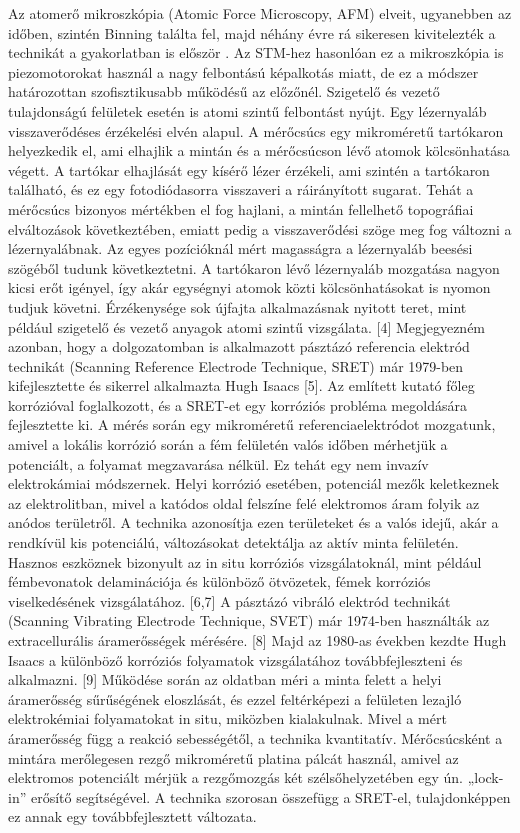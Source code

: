 Az atomerő mikroszkópia (Atomic Force Microscopy, AFM) elveit, ugyanebben az időben, szintén Binning találta fel, majd néhány évre rá sikeresen kivitelezték a technikát a gyakorlatban is először \cite{binnig1986atomic}. Az STM-hez hasonlóan ez a mikroszkópia is piezomotorokat használ a nagy felbontású képalkotás miatt, de ez a módszer határozottan szofisztikusabb működésű az előzőnél. Szigetelő és vezető tulajdonságú felületek esetén is atomi szintű felbontást nyújt. Egy lézernyaláb visszaverődéses érzékelési elvén alapul. A mérőcsúcs egy mikroméretű tartókaron helyezkedik el, ami elhajlik a mintán és a mérőcsúcson lévő atomok kölcsönhatása végett. A tartókar elhajlását egy kísérő lézer érzékeli, ami szintén a tartókaron található, és ez egy fotodiódasorra visszaveri a ráirányított sugarat. Tehát a mérőcsúcs bizonyos mértékben el fog hajlani, a mintán fellelhető topográfiai elváltozások következtében, emiatt pedig a visszaverődési szöge meg fog változni a lézernyalábnak. Az egyes pozícióknál mért magasságra a lézernyaláb beesési szögéből tudunk következtetni. A tartókaron lévő lézernyaláb mozgatása nagyon kicsi erőt igényel, így akár egységnyi atomok közti kölcsönhatásokat is nyomon tudjuk követni. Érzékenysége sok újfajta alkalmazásnak nyitott teret, mint például szigetelő és vezető anyagok atomi szintű vizsgálata. [4]
Megjegyezném azonban, hogy a dolgozatomban is alkalmazott pásztázó referencia elektród technikát (Scanning Reference Electrode Technique, SRET) már 1979-ben kifejlesztette és sikerrel alkalmazta Hugh Isaacs [5]. Az említett kutató főleg korrózióval foglalkozott, és a SRET-et egy korróziós probléma megoldására fejlesztette ki. A mérés során egy mikroméretű referenciaelektródot mozgatunk, amivel a lokális korrózió során a fém felületén valós időben mérhetjük a potenciált, a folyamat megzavarása nélkül. Ez tehát egy nem invazív elektrokámiai módszernek. Helyi korrózió esetében, potenciál mezők keletkeznek az elektrolitban, mivel a katódos oldal felszíne felé elektromos áram folyik az anódos területről. A technika azonosítja ezen területeket és a valós idejű, akár a rendkívül kis potenciálú, változásokat detektálja az aktív minta felületén. Hasznos eszköznek bizonyult az in situ korróziós vizsgálatoknál, mint például fémbevonatok delaminációja és különböző ötvözetek, fémek korróziós viselkedésének vizsgálatához. [6,7]
A pásztázó vibráló elektród technikát (Scanning Vibrating Electrode Technique, SVET) már 1974-ben használták az extracellurális áramerősségek mérésére. [8] Majd az 1980-as években kezdte Hugh Isaacs a különböző korróziós folyamatok vizsgálatához továbbfejleszteni és alkalmazni. [9] Működése során az oldatban méri a minta felett a helyi áramerősség sűrűségének eloszlását, és ezzel feltérképezi a felületen lezajló elektrokémiai folyamatokat in situ, miközben kialakulnak. Mivel a mért áramerősség függ a reakció sebességétől, a technika kvantitatív. Mérőcsúcsként a mintára merőlegesen rezgő mikroméretű platina pálcát használ, amivel az elektromos potenciált mérjük a rezgőmozgás két szélsőhelyzetében egy ún. „lock-in” erősítő segítségével. A technika szorosan összefügg a SRET-el, tulajdonképpen ez annak egy továbbfejlesztett változata. 
